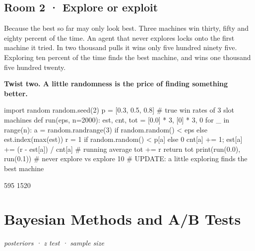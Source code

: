 \documentclass[11pt,a4paper]{report}
\begin{document}
\section*{Room 2 · Explore or exploit}
Because the best so far may only look best. Three machines win thirty, fifty and eighty percent of the time. An agent that never explores locks onto the first machine it tried. In two thousand pulls it wins only five hundred ninety five. Exploring ten percent of the time finds the best machine, and wins one thousand five hundred twenty.
\begin{tcolorbox}[colback=yellow!12,colframe=orange!70!black,boxrule=0.4pt,left=4pt,right=4pt,top=2pt,bottom=2pt]\textbf{Twist two. A little randomness is the price of finding something better.}\end{tcolorbox}
\begin{Code}
import random
random.seed(2)
p = [0.3, 0.5, 0.8]                         # true win rates of 3 slot machines
def run(eps, n=2000):
    est, cnt, tot = [0.0] * 3, [0] * 3, 0
    for _ in range(n):
        a = random.randrange(3) if random.random() < eps else est.index(max(est))
        r = 1 if random.random() < p[a] else 0
        cnt[a] += 1; est[a] += (r - est[a]) / cnt[a]    # running average
        tot += r
    return tot
print(run(0.0), run(0.1))                   # never explore vs explore 10%
# UPDATE: a little exploring finds the best machine
\end{Code}
\begin{Out}
595 1520
\end{Out}
\chapter{Bayesian Methods and A/B Tests}
\textit{posteriors · z test · sample size}
\end{document}
